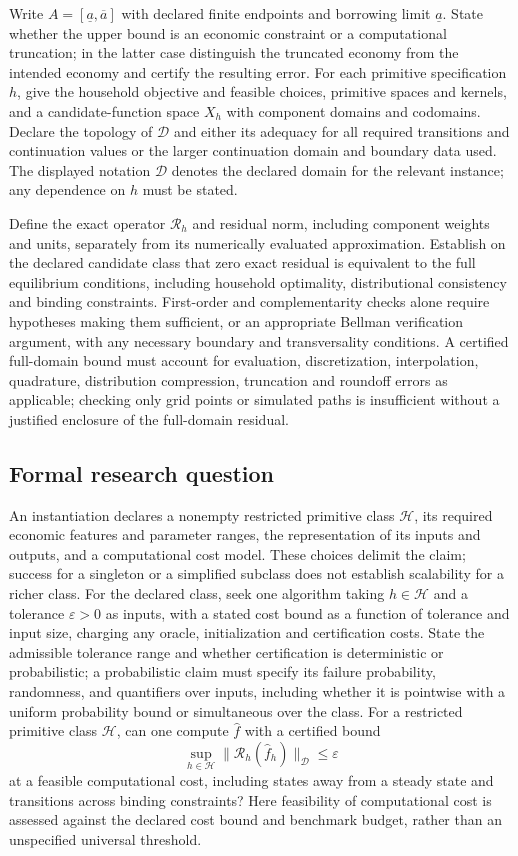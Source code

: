 \documentclass[11pt,a4paper]{article}
\begin{document}
Write $A=[\underline a,\overline a]$ with declared finite endpoints and borrowing limit $\underline a$. State whether the upper bound is an economic constraint or a computational truncation; in the latter case distinguish the truncated economy from the intended economy and certify the resulting error. For each primitive specification $h$, give the household objective and feasible choices, primitive spaces and kernels, and a candidate-function space $X_h$ with component domains and codomains. Declare the topology of $\mathcal D$ and either its adequacy for all required transitions and continuation values or the larger continuation domain and boundary data used. The displayed notation $\mathcal D$ denotes the declared domain for the relevant instance; any dependence on $h$ must be stated.

Define the exact operator $\mathcal R_h$ and residual norm, including component weights and units, separately from its numerically evaluated approximation. Establish on the declared candidate class that zero exact residual is equivalent to the full equilibrium conditions, including household optimality, distributional consistency and binding constraints. First-order and complementarity checks alone require hypotheses making them sufficient, or an appropriate Bellman verification argument, with any necessary boundary and transversality conditions. A certified full-domain bound must account for evaluation, discretization, interpolation, quadrature, distribution compression, truncation and roundoff errors as applicable; checking only grid points or simulated paths is insufficient without a justified enclosure of the full-domain residual.

\subsection*{Formal research question}

An instantiation declares a nonempty restricted primitive class $\mathcal H$, its required economic features and parameter ranges, the representation of its inputs and outputs, and a computational cost model. These choices delimit the claim; success for a singleton or a simplified subclass does not establish scalability for a richer class. For the declared class, seek one algorithm taking $h\in\mathcal H$ and a tolerance $\varepsilon>0$ as inputs, with a stated cost bound as a function of tolerance and input size, charging any oracle, initialization and certification costs. State the admissible tolerance range and whether certification is deterministic or probabilistic; a probabilistic claim must specify its failure probability, randomness, and quantifiers over inputs, including whether it is pointwise with a uniform probability bound or simultaneous over the class. For a restricted primitive class $\mathcal H$, can one compute $\hat f$ with a certified bound
\[
\sup_{h\in\mathcal H}\|\mathcal R_h(\hat f_h)\|_{\mathcal D}\le\varepsilon
\]
at a feasible computational cost, including states away from a steady state and transitions across binding constraints? Here feasibility of computational cost is assessed against the declared cost bound and benchmark budget, rather than an unspecified universal threshold.
\end{document}
